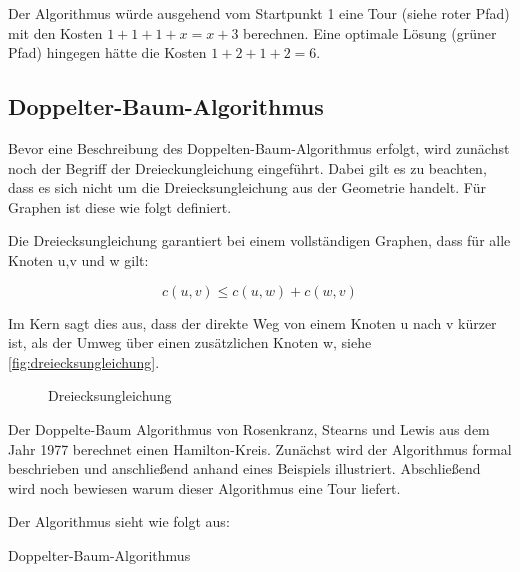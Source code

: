 \documentclass{article}
\begin{document}
Der Algorithmus würde ausgehend vom Startpunkt 1 eine Tour (siehe roter Pfad) mit den Kosten $1+1+1+x = x +3$ berechnen. Eine optimale Lösung (grüner Pfad) hingegen hätte die Kosten $1+2+1+2 = 6$.


\subsection{Doppelter-Baum-Algorithmus}

Bevor eine Beschreibung des Doppelten-Baum-Algorithmus erfolgt, wird zunächst noch der Begriff der Dreieckungleichung eingeführt. Dabei gilt es zu beachten, dass es sich nicht um die Dreiecksungleichung aus der Geometrie handelt. Für Graphen ist diese wie folgt definiert.

Die Dreiecksungleichung garantiert bei einem vollständigen Graphen, dass für alle Knoten u,v und w gilt:

\begin{equation}
c(u,v) \leq c(u,w) + c(w,v)
\end{equation}

Im Kern sagt dies aus, dass der direkte Weg von einem Knoten u nach v kürzer ist, als der Umweg über einen zusätzlichen Knoten w, siehe \autoref{fig:dreiecksungleichung}.

\begin{figure}[H]
\centering
{}
\caption{Dreiecksungleichung}
\label{fig:dreiecksungleichung}
\end{figure}

Der Doppelte-Baum Algorithmus von Rosenkranz, Stearns und Lewis aus dem Jahr 1977 berechnet einen Hamilton-Kreis. Zunächst wird der Algorithmus formal beschrieben und anschließend anhand eines Beispiels illustriert. Abschließend wird noch bewiesen warum dieser Algorithmus eine Tour liefert.

Der Algorithmus sieht wie folgt aus:

\begin{algorithm}
\caption{Doppelter-Baum-Algorithmus}
\end{algorithm}
\end{document}
